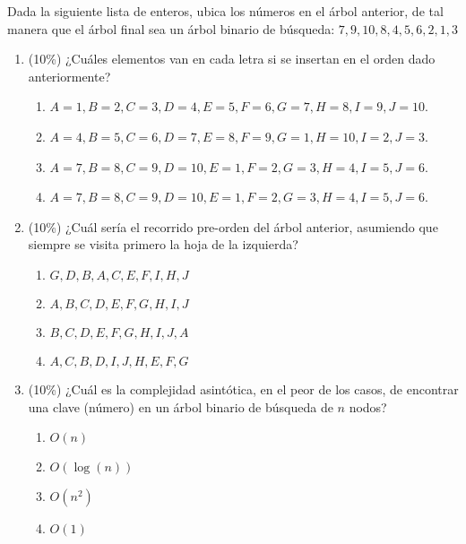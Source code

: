 \documentclass[10 pt]{article}
\begin{document}
\begin{multicols}{2}
\begin{center}
	\end{center}
	Dada la siguiente lista de enteros, ubica los números en el árbol anterior, de tal manera que el árbol final sea un árbol binario de búsqueda: 
	$7, 9, 10, 8, 4, 5, 6, 2, 1, 3$
	\begin{enumerate}[label=\alph*)]
		\item (10\%) ¿Cuáles elementos van en cada letra si se insertan en el orden dado anteriormente?
		\begin{enumerate}[label=\roman*)]
			\item $A = 1, B = 2, C = 3, D = 4, E = 5, F = 6, G = 7, H = 8, I = 9, J = 10$.
			\item $A = 4, B = 5, C = 6, D = 7, E = 8, F = 9, G = 1, H = 10, I = 2, J = 3$.
			\item $A = 7, B = 8, C = 9, D = 10, E = 1, F = 2, G = 3, H = 4, I = 5, J = 6$.
			\item $A = 7, B = 8, C = 9, D = 10, E = 1, F = 2, G = 3, H = 4, I = 5, J = 6$.
		\end{enumerate}
		\item (10\%) ¿Cuál sería el recorrido pre-orden del árbol anterior, asumiendo que siempre se visita primero la hoja de la izquierda?
		\begin{enumerate}[label=\roman*)]
			\item $G, D, B, A, C, E, F, I, H, J$
			\item $A, B, C, D, E, F, G, H, I, J$
			\item $B, C, D, E, F, G, H, I, J, A$
			\item $A, C, B, D, I, J, H, E, F, G$
		\end{enumerate}
		\item (10\%) ¿Cuál es la complejidad asintótica, en el peor de los casos, de encontrar una clave (número) en un árbol binario de búsqueda de $n $ nodos?
		\begin{enumerate}[label=\roman*)]
			\item $O(n)$
			\item $O(\log(n))$
			\item $O(n^2)$
			\item $O(1)$
		\end{enumerate}
	\end{enumerate}

\end{multicols}
\end{document}
